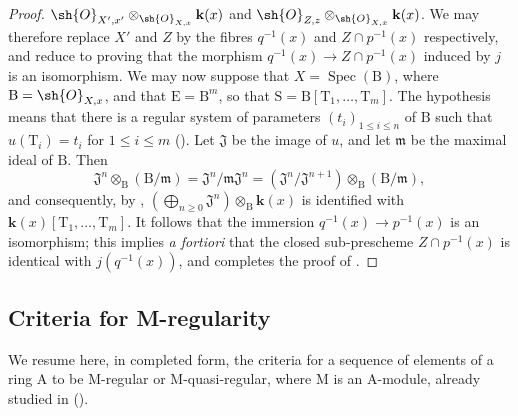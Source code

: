 \begin{proof}
$\sh{O}_{X',x'}\otimes_{\sh{O}_{X,x}}\mathbf{k}(x)$ and
$\sh{O}_{Z,z}\otimes_{\sh{O}_{X,x}}\mathbf{k}(x)$.
We may therefore replace $X'$ and $Z$ by the fibres $q^{-1}(x)$ and $Z\cap p^{-1}(x)$ respectively, and reduce to proving that the morphism
$q^{-1}(x)\to Z\cap p^{-1}(x)$ induced by $j$ is an isomorphism.
We may now suppose that $X=\operatorname{Spec}(\mathrm{B})$, where $\mathrm{B}=\sh{O}_{X,x}$, and that $\mathrm{E}=\mathrm{B}^m$, so that $\mathrm{S}=\mathrm{B}[\mathrm{T}_1,\ldots,\mathrm{T}_m]$.
The hypothesis means that there is a regular system of parameters $(t_i)_{1\leq i\leq n}$ of $\mathrm{B}$ such that $u(\mathrm{T}_i)=t_i$ for $1\leq i\leq m$ ().
Let $\mathfrak{J}$ be the image of $u$, and let $\mathfrak{m}$ be the maximal ideal of $\mathrm{B}$. Then
\[
  \mathfrak{J}^n\otimes_\mathrm{B}(\mathrm{B}/\mathfrak{m})
  =\mathfrak{J}^n/\mathfrak{m}\mathfrak{J}^n
  =(\mathfrak{J}^n/\mathfrak{J}^{n+1})\otimes_\mathrm{B}(\mathrm{B}/\mathfrak{m}),
\]
and consequently, by ,
$(\bigoplus_{n\geq0}\mathfrak{J}^n)\otimes_\mathrm{B}\mathbf{k}(x)$ is identified with
$\mathbf{k}(x)[\mathrm{T}_1,\ldots,\mathrm{T}_m]$.
It follows that the immersion $q^{-1}(x)\to p^{-1}(x)$ is an isomorphism; this implies \emph{a fortiori} that the closed sub-prescheme $Z\cap p^{-1}(x)$ is identical with $j(q^{-1}(x))$, and completes the proof of .
\end{proof}

\subsection{Criteria for M-regularity}
\label{subsection:IV.19.5}

We resume here, in completed form, the criteria for a sequence of elements of a ring $\mathrm{A}$ to be M-regular or M-quasi-regular, where $\mathrm{M}$ is an $\mathrm{A}$-module, already studied in ().

